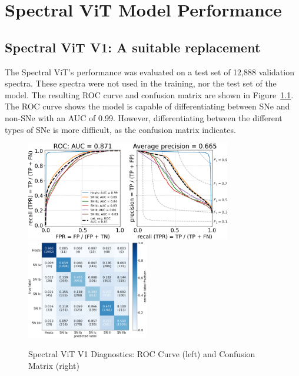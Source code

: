 \chapter{Spectral ViT Model Performance}
\label{chap:results}

\section{Spectral ViT V1: A suitable replacement}\label{sec:v1_results}
The Spectral ViT's performance was evaluated on a test set of 12,888 validation spectra.
These spectra were not used in the training, nor the test set of the model. The resulting 
ROC curve and confusion matrix are shown in Figure~\ref{fig:v1_qual}. The ROC curve 
shows the model is capable of differentiating between SNe and non-SNe with an AUC of 0.99.
However, differentiating between the different types of SNe is more difficult, as the
confusion matrix indicates. 
\begin{figure}
    \centering
    \includegraphics[height=4.3cm]{figures/v1_real/vit_model_V1_original_redorocfulle_e31.png}
    \quad
    \includegraphics[height=4.3cm]{figures/v1_real/vit_model_V1_original_redocmfull_e31.png}
    \caption[Spectral ViT V1 Diagnostics]{Spectral ViT V1 Diagnostics: ROC Curve (left) and Confusion Matrix (right)\label{fig:v1_qual}}
\end{figure}


